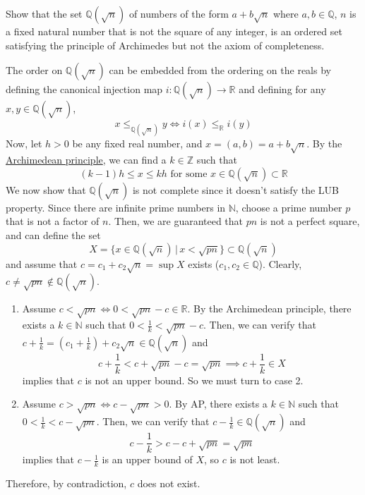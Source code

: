   \begin{exercise}[Zorich 2.2.21]
    Show that the set $\mathbb{Q}(\sqrt{n})$ of numbers of the form $a + b \sqrt{n}$ where $a, b \in \mathbb{Q}$, $n$ is a fixed natural number that is not the square of any integer, is an ordered set satisfying the principle of Archimedes but not the axiom of completeness. 
  \end{exercise}
  \begin{solution}
    The order on $\mathbb{Q}(\sqrt{n})$ can be embedded from the ordering on the reals by defining the canonical injection map $i:\mathbb{Q}(\sqrt{n}) \to \mathbb{R}$ and defining for any $x, y \in \mathbb{Q}(\sqrt{n})$, 
    \begin{equation}
      x \leq_{\mathbb{Q}(\sqrt{n})} y \iff i(x) \leq_{\mathbb{R}} i(y)
    \end{equation}
    Now, let $h > 0$ be any fixed real number, and $x = (a,b) = a + b\sqrt{n}$. By the \hyperref[def:archimedean-principle]{Archimedean principle}, we can find a $k \in \mathbb{Z}$ such that
    \begin{equation}
      (k - 1) h \leq x \leq k h \text{ for some } x \in \mathbb{Q}(\sqrt{n}) \subset \mathbb{R}
    \end{equation}
    We now show that $\mathbb{Q}(\sqrt{n})$ is not complete since it doesn't satisfy the LUB property. Since there are infinite prime numbers in $\mathbb{N}$, choose a prime number $p$ that is not a factor of $n$. Then, we are guaranteed that $pn$ is not a perfect square, and can define the set 
    \begin{equation}
      X = \{x \in \mathbb{Q}(\sqrt{n})\,|\, x < \sqrt{pn} \} \subset \mathbb{Q}(\sqrt{n})
    \end{equation}
    and assume that $c = c_1 + c_2 \sqrt{n} = \sup{X}$ exists ($c_1, c_2 \in \mathbb{Q}$). Clearly, $c \neq \sqrt{pn} \not\in \mathbb{Q}(\sqrt{n})$. 
    \begin{enumerate}
      \item Assume $c < \sqrt{pn} \iff 0 < \sqrt{pn} - c \in \mathbb{R}$. By the Archimedean principle, there exists a $k \in \mathbb{N}$ such that $0 < \frac{1}{k} < \sqrt{pn} - c $. Then, we can verify that $c + \frac{1}{k} = (c_1 + \frac{1}{k}) + c_2 \sqrt{n} \in \mathbb{Q}(\sqrt{n})$ and 
      \begin{equation}
        c + \frac{1}{k} < c + \sqrt{pn} - c = \sqrt{pn} \implies c + \frac{1}{k} \in X
      \end{equation}
      implies that $c$ is not an upper bound. So we must turn to case 2. 
      \item Assume $c > \sqrt{pn} \iff c - \sqrt{pn} > 0$. By AP, there exists a $k \in \mathbb{N}$ such that $0 < \frac{1}{k} < c - \sqrt{pn}$. Then, we can verify that $c - \frac{1}{k} \in \mathbb{Q}(\sqrt{n})$ and 
      \begin{equation}
        c - \frac{1}{k} > c - c + \sqrt{pn} = \sqrt{pn}
      \end{equation}
      implies that $c - \frac{1}{k}$ is an upper bound of $X$, so $c$ is not least. 
    \end{enumerate}
    Therefore, by contradiction, $c$ does not exist. 
  \end{solution}

